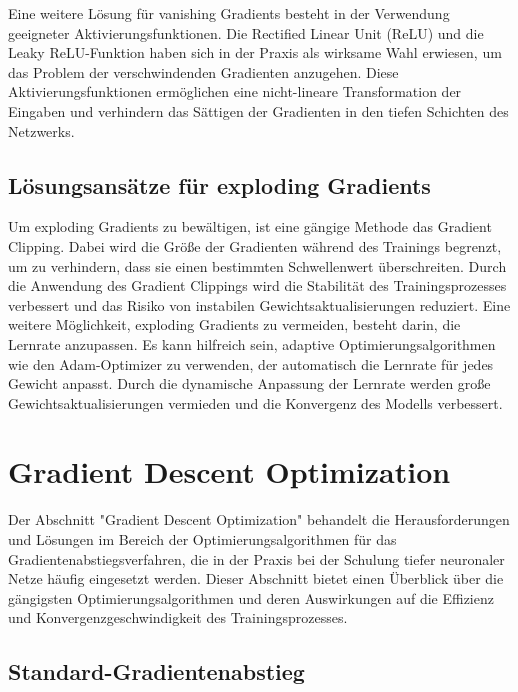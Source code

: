     Eine weitere Lösung für vanishing Gradients besteht in der Verwendung geeigneter Aktivierungsfunktionen. 
    Die Rectified Linear Unit (ReLU) und die Leaky ReLU-Funktion haben sich in der Praxis als wirksame Wahl erwiesen, um das Problem der verschwindenden Gradienten anzugehen. 
    Diese Aktivierungsfunktionen ermöglichen eine nicht-lineare Transformation der Eingaben und verhindern das Sättigen der Gradienten in den tiefen Schichten des Netzwerks.

\subsection{Lösungsansätze für exploding Gradients}

    Um exploding Gradients zu bewältigen, ist eine gängige Methode das Gradient Clipping. 
    Dabei wird die Größe der Gradienten während des Trainings begrenzt, um zu verhindern, dass sie einen bestimmten Schwellenwert überschreiten. 
    Durch die Anwendung des Gradient Clippings wird die Stabilität des Trainingsprozesses verbessert und das Risiko von instabilen Gewichtsaktualisierungen reduziert.
    Eine weitere Möglichkeit, exploding Gradients zu vermeiden, besteht darin, die Lernrate anzupassen. 
    Es kann hilfreich sein, adaptive Optimierungsalgorithmen wie den Adam-Optimizer zu verwenden, der automatisch die Lernrate für jedes Gewicht anpasst. 
    Durch die dynamische Anpassung der Lernrate werden große Gewichtsaktualisierungen vermieden und die Konvergenz des Modells verbessert.

\section{Gradient Descent Optimization}

    Der Abschnitt "Gradient Descent Optimization" behandelt die Herausforderungen und Lösungen im Bereich der Optimierungsalgorithmen für das Gradientenabstiegsverfahren, die in der Praxis bei der Schulung tiefer neuronaler Netze häufig eingesetzt werden. 
    Dieser Abschnitt bietet einen Überblick über die gängigsten Optimierungsalgorithmen und deren Auswirkungen auf die Effizienz und Konvergenzgeschwindigkeit des Trainingsprozesses.

\subsection{Standard-Gradientenabstieg}

